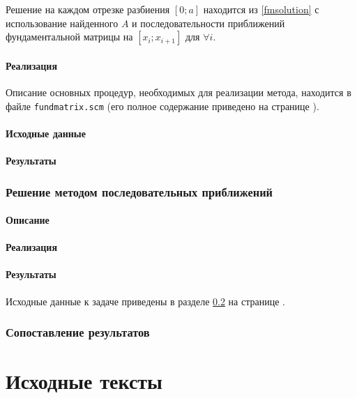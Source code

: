 \documentclass{article}
\numberwithin{equation}{section}
\begin{document}
Решение на каждом отрезке разбиения $[0; a]$ находится из
\eqref{fmsolution} с использование найденного $A$ и последовательности
приближений фундаментальной матрицы на $[x_i; x_{i+1}]$ для $\forall
i$.

\subsection{Реализация}

Описание основных процедур, необходимых для реализации метода,
находится в файле \texttt{fundmatrix.scm} (его полное содержание
приведено на странице \pageref{fundmatrix.scm-full-listing}).

\subsection{Исходные данные}
\label{sec:initial}



\subsection{Результаты}

\section{Решение методом последовательных приближений}

\subsection{Описание}

\subsection{Реализация}

\subsection{Результаты}

Исходные данные к задаче приведены в разделе \ref{sec:initial} на
странице \pageref{sec:initial}.

\section{Сопоставление результатов}

\newpage
\appendix
\part{Исходные тексты}

\end{document}
